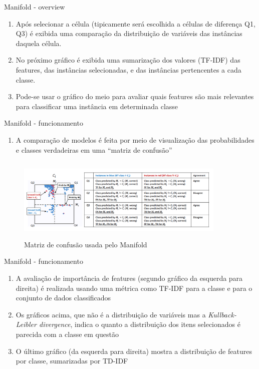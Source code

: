 \begin{frame}
	\begin{block}{Manifold - overview}
		\begin{enumerate}
			\item Após selecionar a célula (tipicamente será escolhida a células de diferença Q1, Q3) é exibida uma comparação da distribuição de variáveis das instâncias daquela célula.
			\item No próximo gráfico é exibida uma sumarização dos valores (TF-IDF) das features, das instâncias selecionadas, e das instâncias pertencentes a cada classe.
			\item Pode-se usar o gráfico do meio para avaliar quais features são mais relevantes para classificar uma instância em determinada classe
		\end{enumerate}
	\end{block}
\end{frame}


\begin{frame}
	\begin{block}{Manifold - funcionamento}
		\begin{enumerate}
			\item A comparação de modelos é feita por meio de visualização das probabilidades e classes verdadeiras em uma ``matriz de confusão''
		\end{enumerate}
		\begin{figure}[!htb]
			\centering	  				
			\includegraphics[height=4cm, width = 10cm]{./pic/matrizManifold.png}
			\caption{Matriz de confusão usada pelo Manifold \cite{Manifold}}
			\label{fig_ds_process}
		\end{figure}	
	\end{block}
\end{frame}


\begin{frame}
	\begin{block}{Manifold - funcionamento}
		\begin{enumerate}
			\item A avaliação de importância de features (segundo gráfico da esquerda para direita) é realizada usando uma métrica como TF-IDF para a classe e para o conjunto de dados classificados
			\item Os gráficos acima, que não é a distribuição de variáveis mas a \emph{Kullback-Leibler divergence}, indica o quanto a distribuição dos itens selecionados é parecida com a classe em questão
			\item O último gráfico (da esquerda para direita) mostra a distribuição de features por classe, sumarizadas por TD-IDF
		\end{enumerate}
	\end{block}
\end{frame}

